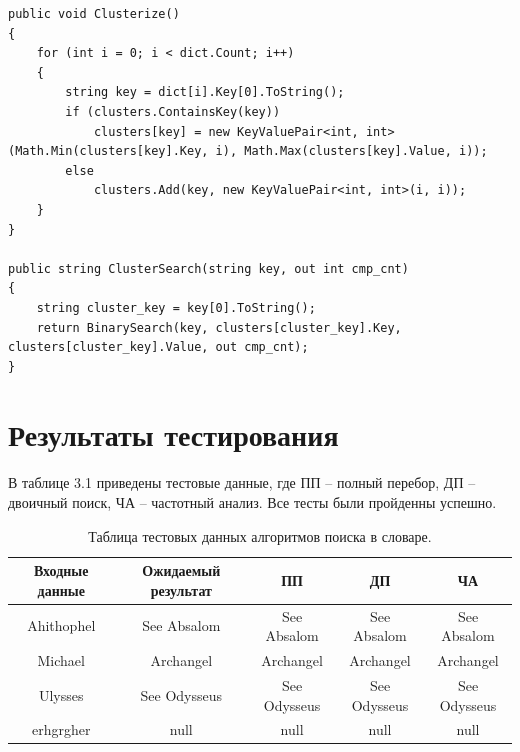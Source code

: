 \documentclass[12pt]{report}
\begin{document}
\begin{lstlisting}[label=some-code,caption=Алгоритм поиска с использованием частотного анализа]
public void Clusterize()
{
	for (int i = 0; i < dict.Count; i++)
	{
		string key = dict[i].Key[0].ToString();
		if (clusters.ContainsKey(key))
			clusters[key] = new KeyValuePair<int, int>(Math.Min(clusters[key].Key, i), Math.Max(clusters[key].Value, i));
		else
			clusters.Add(key, new KeyValuePair<int, int>(i, i));
	}
}

public string ClusterSearch(string key, out int cmp_cnt)
{
	string cluster_key = key[0].ToString();
	return BinarySearch(key, clusters[cluster_key].Key, clusters[cluster_key].Value, out cmp_cnt);
}
\end{lstlisting}
\captionsetup{singlelinecheck = false, justification=centering}

\section{Результаты тестирования}

В таблице 3.1 приведены тестовые данные, где ПП -- полный перебор, ДП -- двоичный поиск, ЧА -- частотный анализ. Все тесты были пройденны успешно.

\begin{table}[H]
	\caption{Таблица тестовых данных алгоритмов поиска в словаре.}
	
	\begin{center}
		
		\begin{tabular}{|c c c c c|} 
			
			\hline
			
			Входные данные & Ожидаемый результат & ПП & ДП & ЧА \\  
			
			\hline
			
			Ahithophel & See Absalom & See Absalom & See Absalom & See Absalom \\
			
			\hline
			
			Michael & Archangel & Archangel & Archangel & Archangel \\
			
			\hline
			
			Ulysses & See Odysseus & See Odysseus & See Odysseus & See Odysseus \\
			
			\hline
			
			erhgrgher & null & null & null & null \\
			\hline
		\end{tabular}
		
	\end{center}
	
\end{table}
\end{document}
